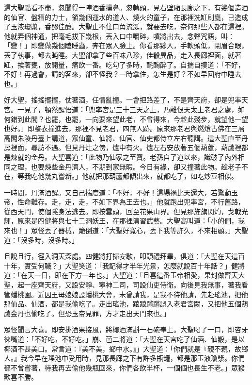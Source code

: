 這大聖點看不盡，忽聞得一陣酒香撲鼻。忽轉頭，見右壁廂長廊之下，有幾個造酒的仙官、盤糟的力士，領幾個運水的道人、燒火的童子，在那裡洗缸刷甕，已造成了玉液瓊漿，香醪佳釀。大聖止不住口角流涎，就要去吃，奈何那些人都在這裡。他就弄個神通，把毫毛拔下幾根，丟入口中嚼碎，噴將出去，念聲咒語，叫：「變！」即變做幾個瞌睡蟲，奔在眾人臉上。你看那夥人，手軟頭低，閉眉合眼，丟了執事，都去盹睡。大聖卻拿了些百味八珍，佳殽異品，走入長廊裡面，就著缸，挨著甕，放開量，痛飲一番。吃勾了多時，酕醄醉了。自揣自摸道：「不好，不好！再過會，請的客來，卻不怪我？一時拿住，怎生是好？不如早回府中睡去也。」

好大聖，搖搖擺擺，仗著酒，任情亂撞。一會把路差了，不是齊天府，卻是兜率天宮。一見了，頓然醒悟道：「兜率宮是三十三天之上，乃離恨天太上老君之處，如何錯到此間？也罷，也罷，一向要來望此老，不曾得來，今趁此殘步，就望他一望也好。」即整衣撞進去，那裡不見老君，四無人跡。原來那老君與燃燈古佛在三層高閣朱陵丹臺上講道，眾仙童、仙將、仙官、仙吏都侍立左右聽講。這大聖直至丹房裡面，尋訪不遇。但見丹灶之傍，爐中有火。爐左右安放著五個葫蘆，葫蘆裡都是煉就的金丹。大聖喜道：「此物乃仙家之至寶。老孫自了道以來，識破了內外相同之理，也要煉些金丹濟人，不期到家無暇。今日有緣，卻又撞著此物。趁老子不在，等我吃他幾丸嘗新。」他就把那葫蘆都傾出來，就都吃了，如吃炒豆相似。

一時間，丹滿酒醒。又自己揣度道：「不好，不好！這場禍比天還大，若驚動玉帝，性命難存。走，走，走，不如下界為王去也。」他就跑出兜率宮，不行舊路，從西天門，使個隱身法逃去。即按雲頭，回至花果山界。但見那旌旗閃灼，戈戟光輝，原來是四健將與七十二洞妖王，在那裡演習武藝。大聖高叫道：「小的們，我來也！」眾怪丟了器械，跪倒道：「大聖好寬心，丟下我等許久，不來相顧。」大聖道：「沒多時，沒多時。」

且說且行，徑入洞天深處。四健將打掃安歇，叩頭禮拜畢，俱道：「大聖在天這百十年，實受何職？」大聖笑道：「我記得才半年光景，怎麼就說百十年話？」健將道：「在天一日，即在下方一年也。」大聖道：「且喜這番玉帝相愛，果封做齊天大聖，起一座齊天府，又設安靜、寧神二司，司設仙吏侍衛。向後見我無事，著我看管蟠桃園。近因王母娘娘設蟠桃大會，未曾請我，是我不待他請，先赴瑤池，把他那仙品、仙酒，都是我偷吃了。走出瑤池，踉踉蹡蹡誤入老君宮闕，又把他五個葫蘆金丹也偷吃了。但恐玉帝見罪，方才走出天門來也。」

眾怪聞言大喜。即安排酒果接風，將椰酒滿斟一石碗奉上。大聖喝了一口，即咨牙徠嘴道：「不好吃，不好吃。」崩、芭二將道：「大聖在天宮吃了仙酒、仙殽，是以椰酒不甚美口。常言道：『美不美，鄉中水。』」大聖道：「你們就是『親不親，故鄉人。』我今早在瑤池中受用時，見那長廊之下有許多瓶罐，都是那玉液瓊漿。你們都不曾嘗著，待我再去偷他幾瓶回來，你們各飲半杯，一個個也長生不老。」眾猴歡喜不勝。

